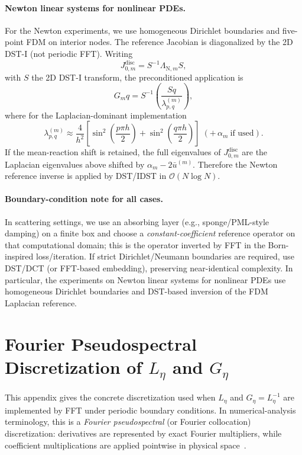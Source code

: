 \documentclass{article}
\theoremstyle{plain}
\theoremstyle{remark}
\begin{document}
\paragraph{Newton linear systems for nonlinear PDEs.}
For the Newton experiments, we use homogeneous Dirichlet boundaries and five-point FDM on interior nodes. The reference Jacobian is diagonalized by the 2D DST-I (not periodic FFT). Writing
\[
J_{0,m}^{\mathrm{disc}} = S^{-1}\Lambda_{\mathrm{N},m}S,
\]
with $S$ the 2D DST-I transform, the preconditioned application is
\[
G_m q = S^{-1}\!\left(\frac{Sq}{\lambda_{p,q}^{(m)}}\right),
\]
where for the Laplacian-dominant implementation
\[
\lambda_{p,q}^{(m)}
\approx
\frac{4}{h^2}\left[\sin^2\!\left(\frac{p\pi h}{2}\right)+\sin^2\!\left(\frac{q\pi h}{2}\right)\right]
\;(+\,\alpha_m\ \text{if used}).
\]
If the mean-reaction shift is retained, the full eigenvalues of $J_{0,m}^{\mathrm{disc}}$ are the Laplacian eigenvalues above shifted by $\alpha_m-2\bar u^{(m)}$. Therefore the Newton reference inverse is applied by DST/IDST in $\mathcal{O}(N\log N)$.

\paragraph{Boundary-condition note for all cases.}
In scattering settings, we use an absorbing layer (e.g., sponge/PML-style damping) on a finite box and choose a \emph{constant-coefficient} reference operator on that computational domain; this is the operator inverted by FFT in the Born-inspired loss/iteration. If strict Dirichlet/Neumann boundaries are required, use DST/DCT (or FFT-based embedding), preserving near-identical complexity.
In particular, the experiments on Newton linear systems for nonlinear PDEs use homogeneous Dirichlet boundaries and DST-based inversion of the FDM Laplacian reference.

\section{Fourier Pseudospectral Discretization of \texorpdfstring{$L_\eta$ and $G_\eta$}{L eta and G eta}}
\label{app:fft_ps}
This appendix gives the concrete discretization used when $L_\eta$ and $G_\eta=L_\eta^{-1}$ are implemented by FFT under periodic boundary conditions. In numerical-analysis terminology, this is a \emph{Fourier pseudospectral} (or Fourier collocation) discretization: derivatives are represented by exact Fourier multipliers, while coefficient multiplications are applied pointwise in physical space~\cite{boyd2001chebyshev,trefethen2000spectral,shen2011spectral}.
\end{document}
